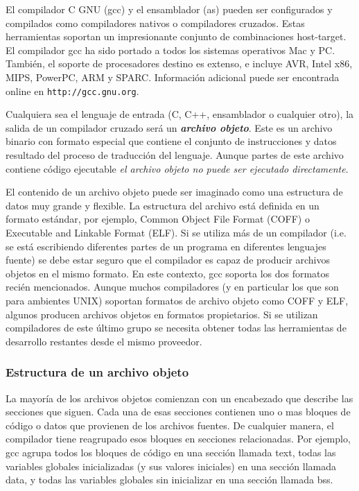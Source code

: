 \documentclass[output=paper, 
colorlinks,
citecolor=brown,
newtxmath
]{langscibook}
\begin{document}
El compilador C GNU (gcc) y el ensamblador (as) pueden ser configurados y compilados
como compiladores nativos o compiladores cruzados. Estas herramientas soportan
un impresionante conjunto de combinaciones host-target. El compilador gcc ha sido
portado a todos los sistemas operativos Mac y PC. También, el soporte de procesadores destino
es extenso, e incluye AVR, Intel x86, MIPS, PowerPC, ARM y SPARC. Información
adicional puede ser encontrada online en \texttt{http://gcc.gnu.org}.

Cualquiera sea el lenguaje de entrada (C, C++, ensamblador o cualquier otro), la salida
de un compilador cruzado será un \textit{\textbf{archivo objeto}}. Este es un archivo binario con
formato especial que contiene el conjunto de instrucciones y datos
resultado del proceso de traducción del lenguaje. Aunque partes de este archivo
contiene código ejecutable \textit{el archivo objeto no puede ser ejecutado directamente}.


El contenido de un archivo objeto puede ser imaginado como una estructura de datos
muy grande y flexible. La estructura del archivo está definida en un formato estándar, 
por ejemplo, Common Object File Format (COFF) o Executable and Linkable Format (ELF).
Si se utiliza más de un compilador (i.e. se está escribiendo diferentes partes de un programa
en diferentes lenguajes fuente) se debe estar seguro que el compilador es capaz
de producir archivos objetos en el mismo formato. En este contexto, gcc soporta 
los dos formatos recién mencionados. Aunque muchos compiladores (y en particular
los que son para ambientes UNIX) soportan formatos de archivo objeto como
COFF y ELF, algunos producen archivos objetos en formatos propietarios.
Si se utilizan compiladores de este último grupo se necesita obtener todas
las herramientas de desarrollo restantes desde el mismo proveedor.

\subsubsection*{Estructura de un archivo objeto}
La mayoría de los archivos objetos comienzan con un encabezado que describe las secciones
que siguen. Cada una de esas secciones contienen uno o mas bloques de código o datos que 
provienen de los archivos fuentes. De cualquier manera, el compilador tiene reagrupado
esos bloques en secciones relacionadas. Por ejemplo, gcc agrupa todos los bloques de
código en una sección llamada text, todas las variables globales inicializadas (y sus
valores iniciales) en una sección llamada data, y todas las variables globales sin 
inicializar en una sección llamada bss.
\end{document}
